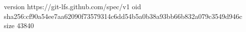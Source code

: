 version https://git-lfs.github.com/spec/v1
oid sha256:cf90a54ee7aa62090f73579314c6dd54b5a0b38a93bb66b832a079c3549d946c
size 43840
